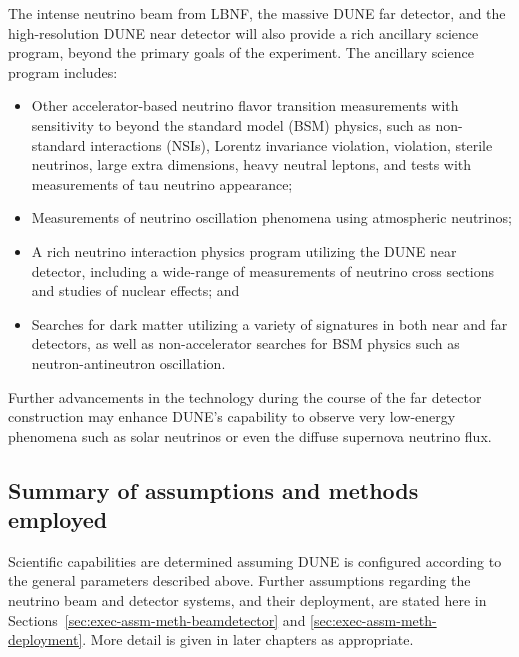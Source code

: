 The intense neutrino beam from LBNF, the massive DUNE \lartpc
far detector, and the high-resolution DUNE near detector will also
provide a rich ancillary science program, beyond the primary goals
of the experiment. The ancillary science program includes:
\begin{itemize}

\item Other accelerator-based neutrino flavor transition measurements with
      sensitivity to beyond the standard model (BSM) physics, such as non-standard
      interactions (NSIs), Lorentz invariance violation,  violation,
      sterile neutrinos, large extra dimensions, heavy neutral leptons,
      and tests with measurements of tau neutrino appearance;

     \item Measurements of neutrino oscillation phenomena using atmospheric neutrinos;

     \item A rich neutrino interaction physics program utilizing the DUNE near detector,
           including a wide-range of measurements of neutrino cross sections and studies of
           nuclear effects; and

     \item Searches for dark matter utilizing a variety of
           signatures in both
           near and far detectors, as well as  
           non-accelerator searches for BSM physics 
           such as neutron-antineutron oscillation.

\end{itemize}

Further advancements in the \lartpc %
technology during the course of the far detector construction
may enhance DUNE's capability to observe very low-energy
phenomena such as solar neutrinos or even the diffuse
supernova neutrino flux.

\subsection{Summary of assumptions and methods employed}
\label{sec:exec-assm-meth}

Scientific capabilities are determined assuming DUNE
is configured according to the general parameters described above.
Further assumptions regarding the neutrino beam and detector 
systems, and their deployment, are stated here in
Sections~\ref{sec:exec-assm-meth-beamdetector} and
\ref{sec:exec-assm-meth-deployment}.  More detail is given
in later chapters as appropriate.

